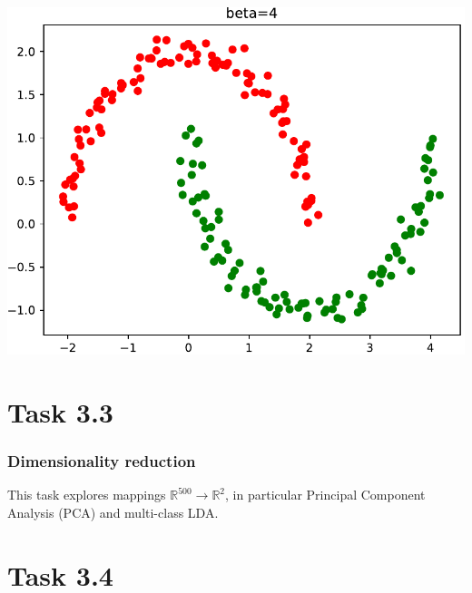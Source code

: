 \documentclass{beamer}
\begin{document}
\begin{frame}
\begin{overprint}
		\includegraphics[width=\linewidth]{graphics/task_3_2_spectral4}
	\end{overprint}
\end{frame}

\section{Task 3.3}
\begin{frame}
	\frametitle{Dimensionality reduction}
	This task explores mappings $\mathbb{R}^{500} \to \mathbb{R}^2$, in particular Principal Component Analysis (PCA) and multi-class LDA.
\end{frame}

\section{Task 3.4}
\end{document}
